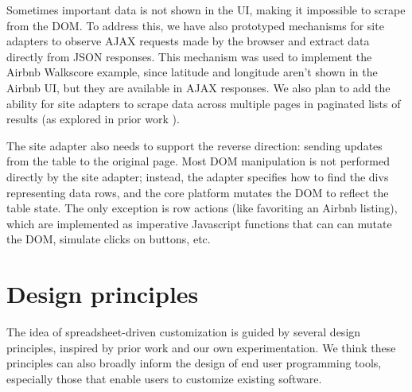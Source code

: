 \documentclass[english,submission]{programming}
\newenvironment{Shaded}{}{}
\newcommand{\CommentTok}[1]{\textcolor[rgb]{0.38,0.63,0.69}{\textit{#1}}}
\newcommand{\FunctionTok}[1]{\textcolor[rgb]{0.02,0.16,0.49}{#1}}
\newcommand{\KeywordTok}[1]{\textcolor[rgb]{0.00,0.44,0.13}{\textbf{#1}}}
\newcommand{\NormalTok}[1]{#1}
\newcommand{\OperatorTok}[1]{\textcolor[rgb]{0.40,0.40,0.40}{#1}}
\newcommand{\SpecialCharTok}[1]{\textcolor[rgb]{0.25,0.44,0.63}{#1}}
\newcommand{\StringTok}[1]{\textcolor[rgb]{0.25,0.44,0.63}{#1}}
\newcommand{\VariableTok}[1]{\textcolor[rgb]{0.10,0.09,0.49}{#1}}
\newcommand{\VerbatimStringTok}[1]{\textcolor[rgb]{0.25,0.44,0.63}{#1}}
\begin{document}
\begin{Shaded}
\end{Shaded}

Sometimes important data is not shown in the UI, making it impossible to
scrape from the DOM. To address this, we have also prototyped mechanisms
for site adapters to observe AJAX requests made by the browser and
extract data directly from JSON responses. This mechanism was used to
implement the Airbnb Walkscore example, since latitude and longitude
aren't shown in the Airbnb UI, but they are available in AJAX responses.
We also plan to add the ability for site adapters to scrape data across
multiple pages in paginated lists of results (as explored in prior work
\autocite{huynh2006}).

The site adapter also needs to support the reverse direction: sending
updates from the table to the original page. Most DOM manipulation is
not performed directly by the site adapter; instead, the adapter
specifies how to find the divs representing data rows, and the core
platform mutates the DOM to reflect the table state. The only exception
is row actions (like favoriting an Airbnb listing), which are
implemented as imperative Javascript functions that can can mutate the
DOM, simulate clicks on buttons, etc.

\hypertarget{design-principles}{%
\section{Design principles}\label{design-principles}}

The idea of spreadsheet-driven customization is guided by several design
principles, inspired by prior work and our own experimentation. We think
these principles can also broadly inform the design of end user
programming tools, especially those that enable users to customize
existing software.
\end{document}
